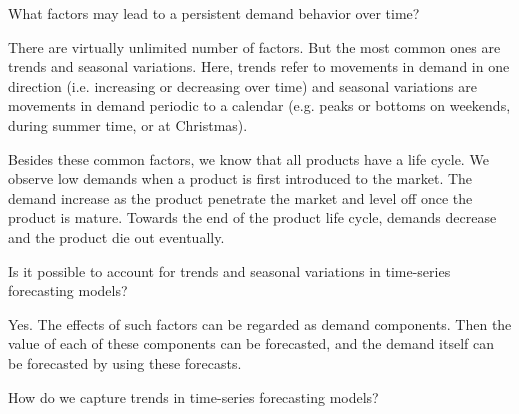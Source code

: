 \begin{question}
What factors may lead to a persistent demand behavior over time?

\end{question}

  \begin{solution}
    There are virtually unlimited number of factors. But the most common ones are trends and seasonal variations. Here, trends refer to movements in demand in one direction (i.e. increasing or decreasing over time) and seasonal variations are movements in demand periodic to a calendar (e.g. peaks or bottoms on weekends, during summer time, or at Christmas).
    
    Besides these common factors, we know that all products have a life cycle. We observe low demands when a product is first introduced to the market. The demand increase as the product penetrate the market and level off once the product is mature. Towards the end of the product life cycle, demands decrease and the product die out eventually. 
      \end{solution}


\begin{question}
Is it possible to account for trends and seasonal variations in time-series forecasting models?
\end{question}
   
  \begin{solution}
   Yes. The effects of such factors can be regarded as demand components. Then the value of each of these components can be forecasted, and the demand itself can be forecasted by using these forecasts. 
     \end{solution}
     
\begin{question}
How do we capture trends in time-series forecasting models?
\end{question}

